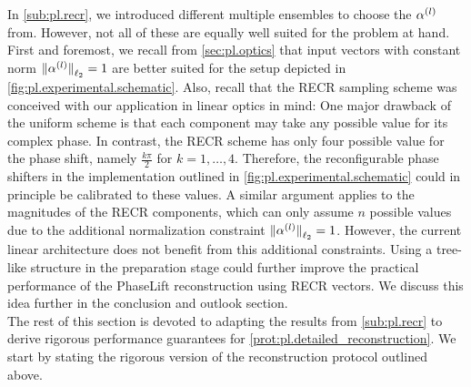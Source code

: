 In \cref{sub:pl.recr}, we introduced different multiple ensembles to choose the $\alpha^{(l)}$ from.
However, not all of these are equally well suited for the problem at hand.
First and foremost, we recall from \cref{sec:pl.optics} that input vectors with constant norm ${\Vert\alpha^{(l)}\Vert}_{\ell_2} = 1$ are better suited for the setup depicted in \cref{fig:pl.experimental.schematic}.
Also, recall that the RECR sampling scheme was conceived with our application in linear optics in mind:
One major drawback of the uniform scheme is that each component may take any possible value for its complex phase.
In contrast, the RECR scheme has only four possible value for the phase shift, namely $\frac{k \pi}{2}$ for $k=1,\ldots,4$.
Therefore, the reconfigurable phase shifters in the implementation outlined in \cref{fig:pl.experimental.schematic} could in principle be calibrated to these values.
A similar argument applies to the magnitudes of the RECR components, which can only assume $n$ possible values due to the additional normalization constraint ${\Vert\alpha^{(l)}\Vert}_{\ell_2} = 1$.
However, the current linear architecture does not benefit from this additional constraints.
Using a tree-like structure in the preparation stage could further improve the practical performance of the PhaseLift reconstruction using RECR vectors.
We discuss this idea further in the conclusion and outlook section.\\



The rest of this section is devoted to adapting the results from \cref{sub:pl.recr} to derive rigorous performance guarantees for \cref{prot:pl.detailed_reconstruction}.
We start by stating the rigorous version of the reconstruction protocol outlined above.

